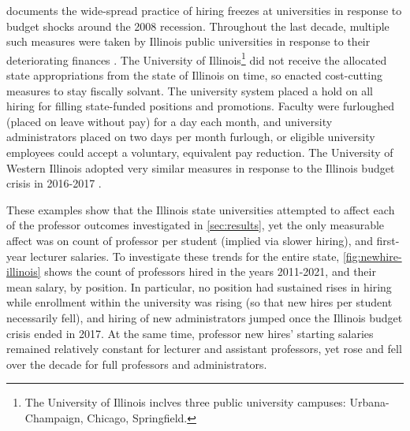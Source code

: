 \documentclass[notitlepage,12pt]{article}
\begin{document}
\cite{turner2014impact} documents the wide-spread practice of hiring freezes at universities in response to budget shocks around the 2008 recession.
Throughout the last decade, multiple such measures were taken by Illinois public universities in response to their deteriorating finances \citep{furlough2010}.
The University of Illinois\footnote{
    The University of Illinois inclves three public university campuses: Urbana-Champaign, Chicago, Springfield.
} did not receive the allocated state appropriations from the state of Illinois on time, so enacted cost-cutting measures to stay fiscally solvant.
The university system placed a hold on all hiring for filling state-funded positions and promotions.
Faculty were furloughed (placed on leave without pay) for a day each month, and university administrators placed on two days per month furlough, or eligible university employees could accept a voluntary, equivalent pay reduction.
The University of Western Illinois adopted very similar measures in response to the Illinois budget crisis in 2016-2017 \citep{wiu2016}.

These examples show that the Illinois state universities attempted to affect each of the professor outcomes investigated in \autoref{sec:results}, yet the only measurable affect was on count of professor per student (implied via slower hiring), and first-year lecturer salaries.
To investigate these trends for the entire state, \autoref{fig:newhire-illinois} shows the count of professors hired in the years 2011-2021, and their mean salary, by position.
In particular, no position had sustained rises in hiring while enrollment within the university was rising (so that new hires per student necessarily fell), and hiring of new administrators jumped once the Illinois budget crisis ended in 2017.
At the same time, professor new hires' starting salaries remained relatively constant for lecturer and assistant professors, yet rose and fell over the decade for full professors and administrators.
\end{document}
